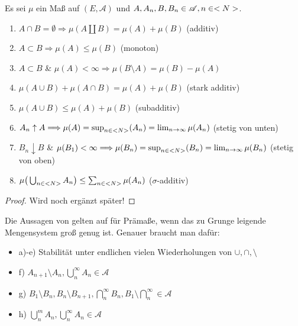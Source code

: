 \begin{proposition}
	Es sei $\mu$ ein Maß auf $(E,\mathscr{A})$ und $A,A_n,B, B_n \in \mathscr{A}, n \in <N>$.
	\begin{enumerate}[label=(\alph*)]
		\item $A\cap B = \emptyset \Longrightarrow \mu(A \coprod B) = \mu(A) + \mu(B)$ (additiv)
		\item $A\subset B \Longrightarrow \mu(A) \leq \mu(B)$ (monoton)
		\item $A \subset B$ \& $\mu(A) < \infty \Longrightarrow \mu(B\setminus A) = \mu(B) - \mu(A)$
		\item $\mu(A \cup B) + \mu(A\cap B) = \mu(A) + \mu(B)$ (stark additiv)
		\item $\mu(A \cup B) \leq \mu(A) + \mu(B)$ (subadditiv)
		\item $A_n \uparrow A \Longrightarrow \mu(A)  = \sup_{n\in <N>} (A_n) = \lim_{n\to \infty} \mu(A_n)$ (stetig von unten)
		\item $B_n \downarrow B$ \& $\mu(B_1) < \infty \Longrightarrow \mu(B_n)  = \sup_{n\in <N>} (B_n) = \lim_{n\to \infty} \mu(B_n)$ (stetig von oben)
		\item $\mu\big(\bigcup_{n\in <N>} A_n\big) \leq \sum_{n\in <N>} \mu (A_n)$ ($\sigma$-additiv)
	\end{enumerate}
\end{proposition}

\begin{proof}
	Wird noch ergänzt später!
\end{proof}

\begin{remark}
	Die Aussagen von  gelten auf für Prämaße, wenn das zu Grunge leigende Mengensystem groß genug ist. Genauer braucht man dafür:
	\begin{itemize} %
		\item a)-e) Stabilität unter endlichen vielen Wiederholungen von $\cup,\cap,\setminus$
		\item f) $A_{n+1}\setminus A_n,\bigcup_{n}^{\infty} A_n \in \mathscr{A}$
		\item g) $B_1 \setminus B_n,B_n \setminus B_{n+1},\bigcap_{n}^{\infty} B_n,B_1\setminus \bigcap_{n}^{\infty} \in \mathscr{A}$
		\item h) $\bigcup_{n}^{m} A_n,\bigcup_{n}^{\infty} A_n \in \mathscr{A}$
	\end{itemize}
\end{remark}

